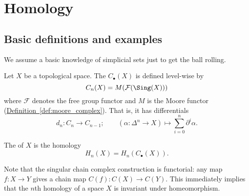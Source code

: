 \documentclass[main.tex]{subfiles}
\begin{document}
\chapter{Homology}
\label{ch:homology}

\section{Basic definitions and examples}
\label{sec:basic_definitions}

We assume a basic knowledge of simplicial sets just to get the ball rolling.

\begin{definition}
  \label{def:singular_complex_homology}
  Let $X$ be a topological space. The  $C_{\bullet}(X)$ is defined level-wise by
  \begin{equation*}
    C_{n}(X) = M(\mathcal{F}(\Sing(X)))
  \end{equation*}
  where $\mathcal{F}$ denotes the free group functor and $M$ is the Moore functor (\hyperref[def:moore_complex]{Definition~\ref*{def:moore_complex}}). That is, it has differentials
  \begin{equation*}
    d_{n}\colon C_{n} \to C_{n-1};\qquad (\alpha\colon \Delta^{n} \to X) \mapsto \sum_{i = 0}^{n} \partial^{i} \alpha.
  \end{equation*}

  The  of $X$ is the homology
  \begin{equation*}
    H_{n}(X) = H_{n}(C_{\bullet}(X)).
  \end{equation*}
\end{definition}

Note that the singular chain complex construction is functorial: any map $f\colon X \to Y$ gives a chain map $C(f)\colon C(X) \to C(Y)$. This immediately implies that the $n$th homology of a space $X$ is invariant under homeomorphism.
\end{document}
